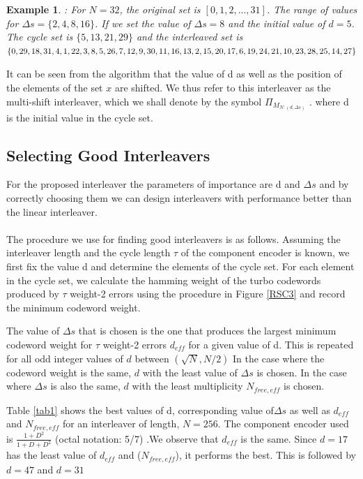 \documentclass[twocolumn]{article}
\newtheorem{example}[theorem]{Example}
\begin{document}
  \begin{example}
  \label{E2}
 : For $N=32$, the original set is $[0,1,2,...,31]$. The range of values for 
 $\Delta s = \{ 2,4,8,16\}$.  If we set the value
 of $\Delta s = 8$ and the initial value of $d=5$. 
 The cycle set is $\{ 5,13,21,29\}$ and the interleaved set is 
  $\{0, 29, 18, 31, 4, 1, 22, 3, 8, 5, 26, 7, 12, 9, 30, 11, 16, 13, 2,\\
  15, 20, 17, 6, 19, 24, 21, 10, 23, 28,25, 14, 27\}$
 
 \end{example}
 It can be seen from the algorithm that the value of d as well as the position of the 
 elements of the set $x$ are shifted. We thus refer to this interleaver as the multi-shift 
 interleaver, which we shall denote by the symbol $\Pi_{\mathit{M}_{N:(d,\Delta s)}}$ .
 where d is the initial value in the cycle set.

 \subsection{Selecting Good Interleavers}
 For the proposed interleaver the parameters of importance are d and $\Delta s$ and
 by correctly choosing them we can design interleavers with performance better
 than the linear interleaver. 
  \paragraph{}
 The procedure we use for finding good interleavers is as follows. Assuming
 the interleaver length and the cycle length $\tau$ of the component 
 encoder is known, we first fix the value d and determine the elements of the cycle set.
 For each element in the cycle set, we calculate the hamming weight of the 
 turbo codewords 
 produced by $\tau$ weight-2 errors
 using the procedure in Figure \ref{RSC3} and record the minimum codeword weight. 

 
 The value of 
 $\Delta s$ that is chosen is the one that produces the largest minimum codeword 
 weight for $\tau$ weight-2 errors $d_{eff}$
 for a given value of d. This is repeated for all odd integer values of $d$
  between $(\sqrt{N},N/2)$
  In the case where the codeword weight is the same, 
 $d$ with the least value of $\Delta s$ is chosen. In the case where $\Delta s$ is also
 the same, $d$ with the least multiplicity $N_{free,eff}$ is chosen.
   
 Table \ref{tab1} shows the best values of d, corresponding value of$\Delta s$
 as well as  $d_{eff}$ and $N_{free,eff}$
  for an interleaver 
 of length, $N=256$. The component encoder used is $\frac{1 + D^2}{1+D+D^2}$ 
 (octal notation: 5/7) .We observe that $d_{eff}$ is the same. Since $d=17$ has the least
 value of $d_{eff}$ and ($N_{free,eff}$), it performs the best. This is followed by
 $d=47$ and $d=31$
 
\end{document}
